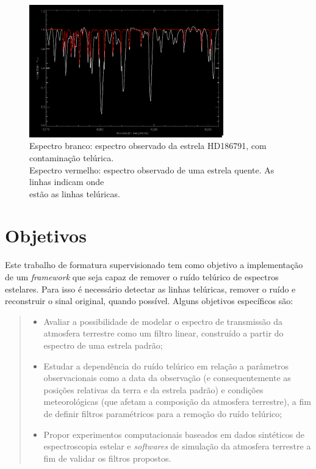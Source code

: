 \documentclass[11pt,twoside,a4paper]{article}
\begin{document}
\begin{figure}[!ht]
  \centering
  \includegraphics[width=0.75\textwidth]{telluric_spectrum.png}
  \caption[Espectro branco: espectro observado da estrela HD186791, com contaminação telúrica. Espectro vermelho: espectro observado de uma estrela quente, as linhas indicam onde estão as linhas telúricas.]
    {Espectro branco: espectro observado da estrela HD186791, com contaminação telúrica. \\ Espectro vermelho: espectro observado de uma estrela quente. As linhas indicam onde \\estão as linhas telúricas.\endtabular}
\end{figure}

\section{Objetivos}
\doublespacing
Este trabalho de formatura supervisionado tem como objetivo a implementação  de um \textit{framework} que seja capaz de remover o ruído telúrico de espectros estelares. Para isso é necessário detectar as linhas telúricas, remover o ruído e reconstruir o sinal original, quando possível. Alguns objetivos específicos são:
\newpage
\begin{quote}\begin{itemize}
    \item Avaliar a possibilidade de modelar o espectro de transmissão da atmosfera terrestre como um filtro linear, construído a partir do espectro de uma estrela padrão;
    \item Estudar a dependência do ruído telúrico em relação a parâmetros observacionais como a data da observação (e consequentemente as posições relativas da terra e da estrela padrão) e condições meteorológicas (que afetam a composição da atmosfera terrestre), a fim de definir filtros paramétricos para a remoção do ruído telúrico;
    \item Propor experimentos computacionais baseados em dados sintéticos de espectroscopia estelar e \textit{softwares} de simulação da atmosfera terrestre \cite{bertaux2014tapas} a fim de validar os filtros propostos.
\end{itemize}\end{quote}
\end{document}
